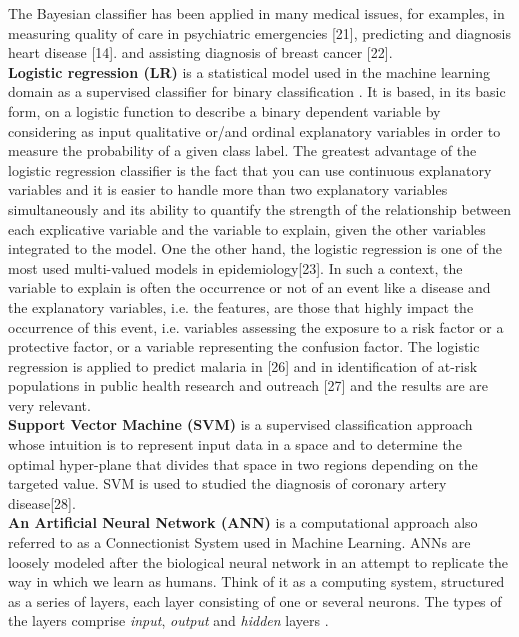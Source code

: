 The Bayesian classifier has been applied in many medical issues, for examples, in measuring quality of care in psychiatric emergencies [21], predicting and diagnosis heart disease [14]. and assisting diagnosis of breast cancer [22].\\
\textbf{Logistic regression (LR)} \cite{Ph88} is a statistical model used in the machine learning domain as a supervised classifier for binary classification \cite{uddin2019comparing}. 
It is based, in its basic form, on a logistic function to describe a binary dependent variable\cite{wang2014support,de2018binary} by considering as input 
qualitative or/and ordinal explanatory variables  in order to measure the probability of a given class label. The greatest advantage  of the logistic regression
classifier is the fact that you can use continuous explanatory variables and it is easier to handle more than two explanatory variables simultaneously and its ability to quantify the strength of the relationship between each explicative variable and the variable to explain, given the other variables integrated to the model. One the other hand, the logistic regression is one of the most used multi-valued models in epidemiology[23]. In such a context, the variable to explain is often the occurrence or not of an event like a disease and the explanatory variables, i.e. the features, are those that highly impact the occurrence of this event, i.e. variables assessing the exposure to a risk factor or a protective factor, or a variable representing the confusion factor. The logistic regression is applied to predict malaria in [26] and in identification of at-risk populations in public health research and outreach [27] and the results are  are very relevant.\\
\textbf{Support Vector Machine (SVM)} \cite{Ev01} is a supervised classification approach whose intuition is to represent input data in a space and to determine the optimal hyper-plane that divides that space in two regions depending on the targeted value.
SVM is used to studied the diagnosis of coronary artery disease[28].\\
\textbf{An Artificial Neural Network (ANN)} \cite{Me19} is a computational approach also referred to as a Connectionist System used in Machine Learning. ANNs are loosely modeled after the biological neural network in an attempt to replicate the way in which we learn as humans. Think of it as a computing system, structured as a series of layers, each layer consisting of one or several neurons. The types of the layers comprise \emph{input}, \emph{output} and \emph{hidden} layers \cite{anderson1972simple,raschka2015python}.
